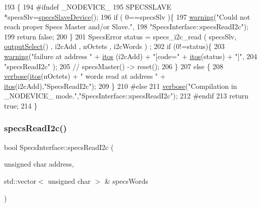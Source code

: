 \begin{DoxyCode}
193                                               \{
194 \textcolor{preprocessor}{#ifndef \_NODEVICE\_
}
195   SPECSSLAVE *specsSlv=\hyperlink{classSpecsInterface_ac8d4711197f484f055533ec1e5ae01a1}{specsSlaveDevice}();
196   \textcolor{keywordflow}{if} ( 0==specsSlv )\{
197     \hyperlink{classObject_a65cd4fda577711660821fd2cd5a3b4c9}{warning}(\textcolor{stringliteral}{"Could not reach proper Specs Master and/or Slave."},
198             \textcolor{stringliteral}{"SpecsInterface::specsReadI2c"});
199     \textcolor{keywordflow}{return} \textcolor{keyword}{false};
200   \}
201   SpecsError status = specs\_i2c\_read ( specsSlv, \hyperlink{classSpecsInterface_ab291ed03f4c2f0143e14c26ad5f648dd}{outputSelect}() , i2cAdd , nOctets , i2cWords )
      ;
202   \textcolor{keywordflow}{if} (0!=status)\{
203     \hyperlink{classObject_a65cd4fda577711660821fd2cd5a3b4c9}{warning}(\textcolor{stringliteral}{"failure at address "} + \hyperlink{Tools_8h_af330027dbdafb9a30768b3613c553e60}{itos} (i2cAdd) + \textcolor{stringliteral}{"[code="} + \hyperlink{Tools_8h_af330027dbdafb9a30768b3613c553e60}{itos}(status) + \textcolor{stringliteral}{"]"},
204             \textcolor{stringliteral}{"specsReadI2c"} );
205     \textcolor{comment}{//    specsMaster() -> reset();}
206   \}
207   \textcolor{keywordflow}{else} \{
208     \hyperlink{classObject_a83d2db2df682907ea1115ad721c1c4a1}{verbose}(\hyperlink{Tools_8h_af330027dbdafb9a30768b3613c553e60}{itos}(nOctets) + \textcolor{stringliteral}{" words read at address "} + \hyperlink{Tools_8h_af330027dbdafb9a30768b3613c553e60}{itos}(i2cAdd),\textcolor{stringliteral}{"SpecsReadI2c"});
209   \}
210 \textcolor{preprocessor}{#else
}
211   \hyperlink{classObject_a83d2db2df682907ea1115ad721c1c4a1}{verbose}(\textcolor{stringliteral}{"Compilation in \_NODEVICE\_ mode."},\textcolor{stringliteral}{"SpecsInterface::specsReadI2c"});
212 \textcolor{preprocessor}{#endif
}
213   \textcolor{keywordflow}{return} \textcolor{keyword}{true};
214 \}
\end{DoxyCode}
\mbox{\label{classSpecsInterface_ab61d866ec9b8a48e84a867004c1ed662}} 
\subsubsection{\texorpdfstring{specs\+Read\+I2c()}{specsReadI2c()}\hspace{0.1cm}{\footnotesize\ttfamily [2/4]}}
{\footnotesize\ttfamily bool Specs\+Interface\+::specs\+Read\+I2c (\begin{DoxyParamCaption}\item[{unsigned char}]{address,  }\item[{std\+::vector$<$ unsigned char $>$ \&}]{specs\+Words }\end{DoxyParamCaption})\hspace{0.3cm}{\ttfamily [inherited]}}

